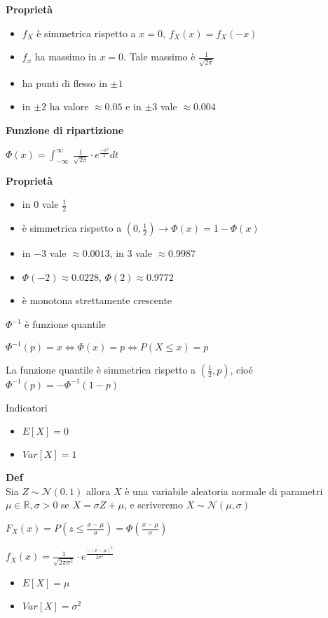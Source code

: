 \documentclass[11pt, letterpaper]{article}
\begin{document}
\textbf{Proprietà}
\begin{itemize}
    \item $f_{X}$ è simmetrica rispetto a $x=0,\ f_{X}(x)=f_{X}(-x)$
    \item $f_{x}$ ha massimo in $x=0$. Tale massimo è $\frac{1}{\sqrt{2\pi}}$
    \item ha punti di flesso in $\pm 1$
    \item in $\pm 2$ ha valore $\approx 0.05$ e in $\pm 3$ vale $\approx 0.004$
\end{itemize}

\textbf{Funzione di ripartizione}
\begin{center}
    $\Phi(x)=\int_{-\infty}^{\infty}\ \frac{1}{\sqrt{2\pi}}\cdot e^{\frac{-x^{2}}{2}} dt$ 
\end{center}

\textbf{Proprietà}
\begin{itemize}
    \item in $0$ vale $\frac{1}{2}$
    \item è simmetrica rispetto a $(0,\frac{1}{2})\rightarrow \Phi(x)=1-\Phi(x)$
    \item in $-3$ vale $\approx 0.0013$, in $3$ vale $\approx 0.9987$
    \item $\Phi(-2)\approx 0.0228$, $\Phi(2)\approx 0.9772$
    \item è monotona strettamente crescente
\end{itemize}

$\Phi^{-1}$ è funzione quantile
\begin{center}
    $\Phi^{-1}(p)=x\Leftrightarrow\Phi(x)=p\Leftrightarrow P(X\leq x)=p$
\end{center}
La funzione quantile è simmetrica rispetto a $(\frac{1}{2},p)$, cioé $\Phi^{-1}(p)=-\Phi^{-1}(1-p)$

Indicatori
\begin{itemize}
    \item $E[X]=0$
    \item $Var[X]=1$
\end{itemize}

\textbf{Def}\\ Sia $Z\sim\mathcal{N}(0,1)$ allora $X$ è una variabile aleatoria normale di parametri
$\mu\in\mathbb{R},\sigma>0$ se $X=\sigma Z+\mu$, e scriveremo $X\sim\mathcal{N}(\mu,\sigma)$
\begin{center}
    $F_{X}(x)=P(z\leq \frac{x-\mu}{\sigma})=\Phi(\frac{x-\mu}{\sigma})$

    $f_{X}(x)=\frac{1}{\sqrt{2\pi\sigma^{2}}}\cdot e^{\frac{-(x-\mu)^{2}}{2\sigma^{2}}}$
\end{center}
\begin{itemize}
    \item $E[X]=\mu$
    \item $Var[X]=\sigma^{2}$
\end{itemize}
\end{document}
